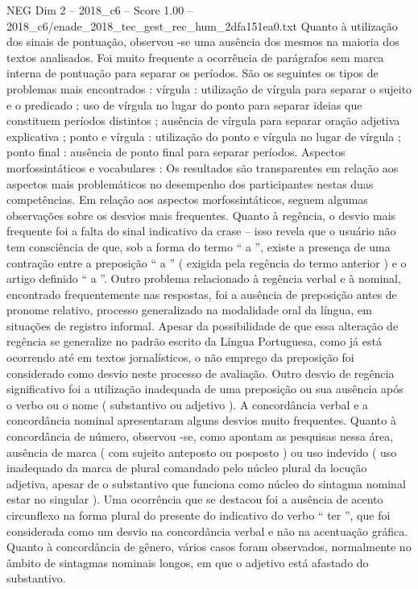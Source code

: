 \begin{textsample}{NEG Dim 2 – 2018\_c6 – Score 1.00 – 2018\_c6/enade\_2018\_tec\_gest\_rec\_hum\_2dfa151ea0.txt}
Quanto à utilização dos sinais de pontuação, observou -se uma ausência dos mesmos na maioria dos textos analisados.
Foi muito frequente a ocorrência de parágrafos sem marca interna de pontuação para separar os períodos.
São os seguintes os tipos de problemas mais encontrados : vírgula : utilização de vírgula para separar o sujeito e o predicado ; uso de vírgula no lugar do ponto para separar ideias que constituem períodos distintos ; ausência de vírgula para separar oração adjetiva explicativa ; ponto e vírgula : utilização do ponto e vírgula no lugar de vírgula ; ponto final : ausência de ponto final para separar períodos.
Aspectos morfossintáticos e vocabulares : Os resultados são transparentes em relação aos aspectos mais problemáticos no desempenho dos participantes nestas duas competências.
Em relação aos aspectos morfossintáticos, seguem algumas observações sobre os desvios mais frequentes.
Quanto à regência, o desvio mais frequente foi a falta do sinal indicativo da crase – isso revela que o usuário não tem consciência de que, sob a forma do termo “ a ”, existe a presença de uma contração entre a preposição “ a ” ( exigida pela regência do termo anterior ) e o artigo definido “ a ”.
Outro problema relacionado à regência verbal e à nominal, encontrado frequentemente nas respostas, foi a ausência de preposição antes de pronome relativo, processo generalizado na modalidade oral da língua, em situações de registro informal.
Apesar da possibilidade de que essa alteração de regência se generalize no padrão escrito da Língua Portuguesa, como já está ocorrendo até em textos jornalísticos, o não emprego da preposição foi considerado como desvio neste processo de avaliação.
Outro desvio de regência significativo foi a utilização inadequada de uma preposição ou sua ausência após o verbo ou o nome ( substantivo ou adjetivo ).
A concordância verbal e a concordância nominal apresentaram alguns desvios muito frequentes.
Quanto à concordância de número, observou -se, como apontam as pesquisas nessa área, ausência de marca ( com sujeito anteposto ou posposto ) ou uso indevido ( uso inadequado da marca de plural comandado pelo núcleo plural da locução adjetiva, apesar de o substantivo que funciona como núcleo do sintagma nominal estar no singular ).
Uma ocorrência que se destacou foi a ausência de acento circunflexo na forma plural do presente do indicativo do verbo “ ter ”, que foi considerada como um desvio na concordância verbal e não na acentuação gráfica.
Quanto à concordância de gênero, vários casos foram observados, normalmente no âmbito de sintagmas nominais longos, em que o adjetivo está afastado do substantivo.

\end{textsample}
